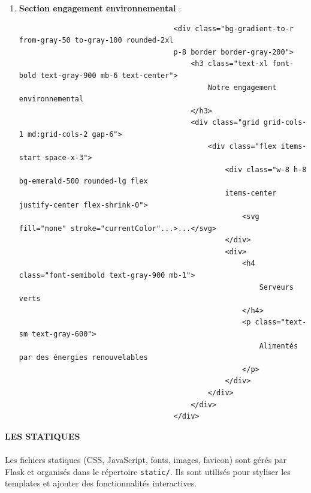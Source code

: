 \documentclass[a4paper,11pt]{article}
\begin{document}
\begin{enumerate}
                        \item \textbf{Section engagement environnemental} :
                            \begin{tcolorbox}[colback=lightgray!5, colframe=gray!80, left=-70mm, right=5mm, top=2mm, bottom=0mm, boxrule=0.1mm]
                                \begin{verbatim}
                                    <div class="bg-gradient-to-r from-gray-50 to-gray-100 rounded-2xl 
                                    p-8 border border-gray-200">
                                        <h3 class="text-xl font-bold text-gray-900 mb-6 text-center">
                                            Notre engagement environnemental
                                        </h3>
                                        <div class="grid grid-cols-1 md:grid-cols-2 gap-6">
                                            <div class="flex items-start space-x-3">
                                                <div class="w-8 h-8 bg-emerald-500 rounded-lg flex 
                                                items-center justify-center flex-shrink-0">
                                                    <svg fill="none" stroke="currentColor"...>...</svg>
                                                </div>
                                                <div>
                                                    <h4 class="font-semibold text-gray-900 mb-1">
                                                        Serveurs verts
                                                    </h4>
                                                    <p class="text-sm text-gray-600">
                                                        Alimentés par des énergies renouvelables
                                                    </p>
                                                </div>
                                            </div>
                                        </div>
                                    </div>
                                \end{verbatim}
                            \end{tcolorbox}
                    \end{enumerate}

            \bigskip
            \textbf{LES STATIQUES}\\\\
            \noindent Les fichiers statiques (CSS, JavaScript, fonts, images, favicon) sont gérés par Flask et organisés dans le répertoire \texttt{static/}. Ils sont utilisés pour styliser les templates et ajouter des fonctionnalités interactives.
\end{document}
